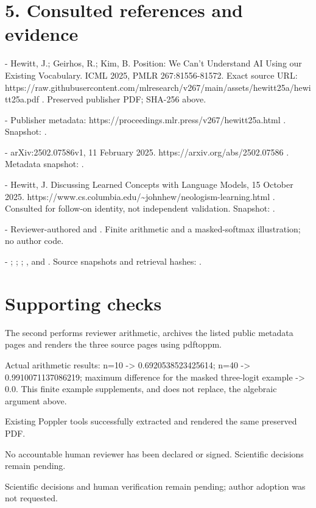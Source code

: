 \documentclass[10pt]{article}
\begin{document}
\section*{5. Consulted references and evidence}
- Hewitt, J.; Geirhos, R.; Kim, B. Position: We Can’t Understand AI Using our Existing Vocabulary. ICML 2025, PMLR 267:81556-81572. Exact source URL: https://raw.githubusercontent.com/mlresearch/v267/main/assets/hewitt25a/hewitt25a.pdf . Preserved publisher PDF; SHA-256 above.\par
- Publisher metadata: https://proceedings.mlr.press/v267/hewitt25a.html . Snapshot: .\par
- arXiv:2502.07586v1, 11 February 2025. https://arxiv.org/abs/2502.07586 . Metadata snapshot: .\par
- Hewitt, J. Discussing Learned Concepts with Language Models, 15 October 2025. https://www.cs.columbia.edu/\textasciitilde{}johnhew/neologism-learning.html . Consulted for follow-on identity, not independent validation. Snapshot: .\par
- Reviewer-authored and . Finite arithmetic and a masked-softmax illustration; no author code.\par
- ; ; ; , and . Source snapshots and retrieval hashes: .\par
\section*{Supporting checks}
The second performs reviewer arithmetic, archives the listed public metadata pages and renders the three source pages using pdftoppm.\par
Actual arithmetic results: n=10 -> 0.6920538523425614; n=40 -> 0.9910071137086219; maximum difference for the masked three-logit example -> 0.0. This finite example supplements, and does not replace, the algebraic argument above.\par
Existing Poppler tools successfully extracted and rendered the same preserved PDF.\par
No accountable human reviewer has been declared or signed. Scientific decisions remain pending.\par
Scientific decisions and human verification remain pending; author adoption was not requested.\par
\end{document}
